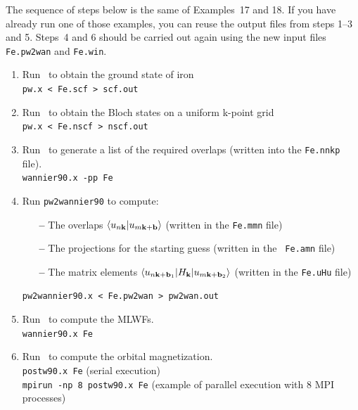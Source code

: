 \documentclass[a4paper,11pt,twoside]{article}
\begin{document}
The sequence of steps below is the same of Examples~17 and 18.  If you
have already run one of those examples, you can reuse the output files
from steps 1--3 and 5. Steps~4 and 6 should be carried out again using
the new input files {\tt Fe.pw2wan} and {\tt Fe.win}.

\begin{enumerate}
\item Run \pwscf\ to obtain the ground state of iron\\
{\tt pw.x < Fe.scf > scf.out}

\item Run \pwscf\ to obtain the Bloch states on a uniform k-point
  grid\\ 
{\tt pw.x < Fe.nscf > nscf.out}

\item Run \wannier\ to generate a list of the required overlaps (written
  into the {\tt Fe.nnkp} file).\\
{\tt wannier90.x -pp Fe}


\item Run {\tt pw2wannier90} to compute:
  \begin{itemize}

  \item[{\bf --}] The overlaps $\langle u_{n{\bf k}}\vert u_{m{\bf k}+{\bf
          b}}\rangle$ (written in the {\tt Fe.mmn} file)

  \item[{\bf --}] The projections for the starting guess (written in the {\tt
        Fe.amn} file)

  \item[{\bf --}] The matrix elements $\langle u_{n{\bf k}+{\bf b}_1}\vert
      H_{\bf k}\vert u_{m{\bf k}+{\bf b}_2}\rangle$ (written in the
      {\tt Fe.uHu} file)


  \end{itemize}
{\tt pw2wannier90.x < Fe.pw2wan > pw2wan.out}

\item Run \wannier\ to compute the MLWFs.\\
{\tt wannier90.x Fe}

\item Run \postw\ to compute the orbital magnetization.\\
  {\tt postw90.x Fe} (serial execution)\\
  {\tt mpirun -np 8 postw90.x Fe} (example of parallel execution with
  8 MPI processes) 


\end{enumerate}
\end{document}
